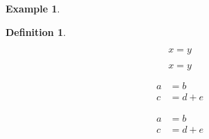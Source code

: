 \documentclass[a4paper,11pt,notitlepage,fullpage]{paper}
\theoremstyle{plain}
\theoremstyle{definition}
\newtheorem{defn}[thm]{Definition} %
\newtheorem{exmp}[thm]{Example} %
\begin{document}
\begin{exmp}

\end{exmp}


\begin{defn}

\end{defn}



\begin{equation}
x = y
\end{equation}


\begin{equation*}
x = y
\end{equation*}


\begin{align}
a &= b \\
c &= d + e
\end{align}


\begin{align*}
a &= b \\
c &= d + e
\end{align*}





%
%
\end{document}
